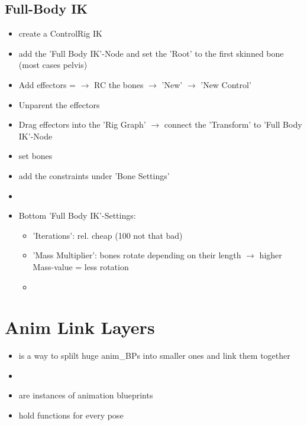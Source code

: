         \subsection{Full-Body IK}
            \begin{itemize}
                \item create a ControlRig IK
                \item add the 'Full Body IK'-Node and set the 'Root' to the first skinned bone (most cases pelvis)
                \item Add effectors = $\rightarrow$ RC the bones $\rightarrow$ 'New' $\rightarrow$ 'New Control'
                \item Unparent the effectors
                \item Drag effectors into the 'Rig Graph' $\rightarrow$ connect the 'Transform' to 'Full Body IK'-Node
                \item set bones
                \item add the constraints under 'Bone Settings'
                \item 
                \item Bottom 'Full Body IK'-Settings:
                \begin{itemize}
                    \item 'Iterations': rel. cheap (100 not that bad)
                    \item 'Mass Multiplier': bones rotate depending on their length $\rightarrow$ higher Mass-value = less rotation
                    \item 
                \end{itemize}
            \end{itemize}

    \section{Anim Link Layers}
        \begin{itemize}
            \item is a way to splilt huge anim\_BPs into smaller ones and link them together
            \item 
            \item are instances of animation blueprints
            \item hold functions for every pose
        \end{itemize}

